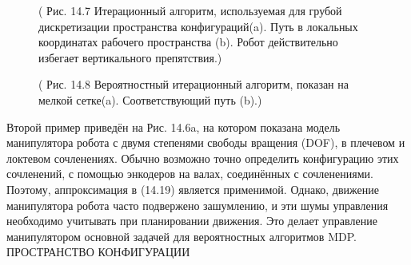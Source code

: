 \documentclass[10pt,a4paper]{article}
\begin{document}
\begin{figure}[H]
	\caption{ ( Рис. 14.7  Итерационный алгоритм, используемая для грубой дискретизации пространства конфигураций(a).  Путь в локальных координатах рабочего пространства (b). Робот действительно избегает вертикального препятствия.) }
	\label{fig:147orig}
\end{figure}

\begin{figure}[H]
	\caption{ ( Рис. 14.8 Вероятностный итерационный алгоритм, показан на мелкой сетке(a).  Соответствующий путь (b).) }
	\label{fig:148orig}
\end{figure}			
Второй пример приведён на Рис. 14.6a, на котором  показана модель манипулятора робота с двумя степенями свободы вращения (DOF), в плечевом и локтевом сочленениях. Обычно возможно точно определить конфигурацию этих сочленений, с помощью энкодеров на валах, соединённых с сочленениями. Поэтому, аппроксимация в (14.19) является применимой. Однако, движение манипулятора робота часто подвержено зашумлению, и эти шумы управления необходимо учитывать при планировании движения. Это делает управление манипулятором основной задачей для вероятностных алгоритмов MDP.\\

ПРОСТРАНСТВО КОНФИГУРАЦИИ\\
\end{document}
